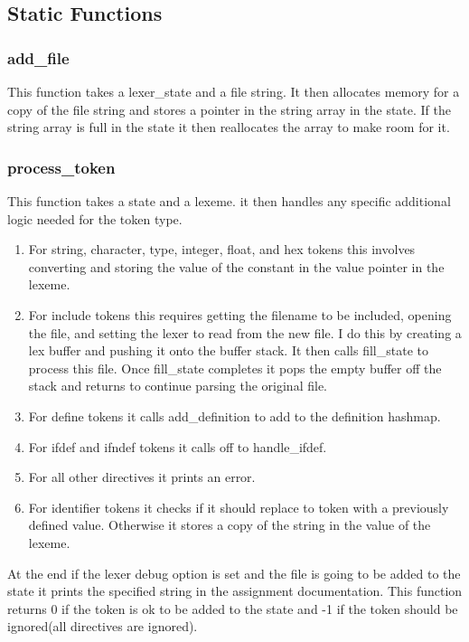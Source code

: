 \documentclass[11pt]{article}
\begin{document}
        \subsection{Static Functions}

            \subsubsection{add\_file}
                This function takes a lexer\_state and a file string. It then allocates memory for a copy of the file string
                and stores a pointer in the string array in the state. If the string array is full in the state it
                then reallocates the array to make room for it.

            \subsubsection{process\_token}
                This function takes a state and a lexeme. it then handles any specific additional logic needed for the token type.
                \begin{enumerate}
                    \item For string, character, type, integer, float, and hex tokens this involves converting and storing the value of the constant
                    in the value pointer in the lexeme. 
                    \item For include tokens this requires getting the filename to be included, opening the file,
                    and setting the lexer to read from the new file. I do this by creating a lex buffer and pushing it onto the buffer stack.
                    It then calls fill\_state to process this file. Once fill\_state completes it pops the empty buffer off the stack and returns
                    to continue parsing the original file.
                    \item For define tokens it calls add\_definition to add to the definition hashmap.\\
                    \item For ifdef and ifndef tokens it calls off to handle\_ifdef.
                    \item For all other directives it prints an error.
                    \item For identifier tokens it checks if it should replace to token with a previously defined value.
                    Otherwise it stores a copy of the string in the value of the lexeme.\\
                \end{enumerate}
                At the end if the lexer debug option is set and the file is going to be added to the state it prints the specified string in the
                assignment documentation. This function returns 0 if the token is ok to be added to the state and -1 if the token should
                be ignored(all directives are ignored).
\end{document}
